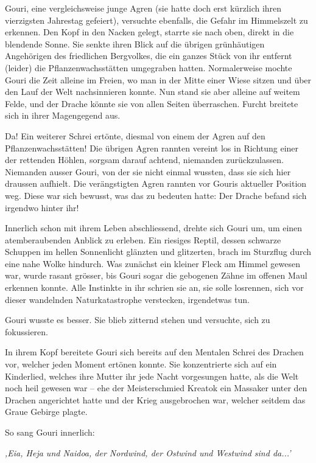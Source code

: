 Gouri, eine vergleichsweise junge Agren (sie hatte doch erst kürzlich ihren vierzigsten Jahrestag gefeiert), versuchte ebenfalls, die Gefahr im Himmelszelt zu erkennen. Den Kopf in den Nacken gelegt, starrte sie nach oben, direkt in die blendende Sonne. Sie senkte ihren Blick auf die übrigen grünhäutigen Angehörigen des friedlichen Bergvolkes, die ein ganzes Stück von ihr entfernt (leider) die Pflanzenwachsstätten umgegraben hatten. Normalerweise mochte Gouri die Zeit alleine im Freien, wo man in der Mitte einer Wiese sitzen und über den Lauf der Welt nachsinnieren konnte. Nun stand sie aber alleine auf weitem Felde, und der Drache könnte sie von allen Seiten überraschen. Furcht breitete sich in ihrer Magengegend aus.

Da! Ein weiterer Schrei ertönte, diesmal von einem der Agren auf den Pflanzenwachsstätten! Die übrigen Agren rannten vereint los in Richtung einer der rettenden Höhlen, sorgsam darauf achtend, niemanden zurückzulassen. Niemanden ausser Gouri, von der sie nicht einmal wussten, dass sie sich hier draussen aufhielt. Die verängstigten Agren rannten vor Gouris aktueller Position weg. Diese war sich bewusst, was das zu bedeuten hatte: Der Drache befand sich irgendwo hinter ihr!

Innerlich schon mit ihrem Leben abschliessend, drehte sich Gouri um, um einen atemberaubenden Anblick zu erleben. Ein riesiges Reptil, dessen schwarze Schuppen im hellen Sonnenlicht glänzten und glitzerten, brach im Sturzflug durch eine nahe Wolke hindurch. Was zunächst ein kleiner Fleck am Himmel gewesen war, wurde rasant grösser, bis Gouri sogar die gebogenen Zähne im offenen Maul erkennen konnte. Alle Instinkte in ihr schrien sie an, sie solle losrennen, sich vor dieser wandelnden Naturkatastrophe verstecken, irgendetwas tun.

Gouri wusste es besser. Sie blieb zitternd stehen und versuchte, sich zu fokussieren.

In ihrem Kopf bereitete Gouri sich bereits auf den Mentalen Schrei des Drachen vor, welcher jeden Moment ertönen konnte. Sie konzentrierte sich auf ein Kinderlied, welches ihre Mutter ihr jede Nacht vorgesungen hatte, als die Welt noch heil gewesen war – ehe der Meisterschmied Kreatok ein Massaker unter den Drachen angerichtet hatte und der Krieg ausgebrochen war, welcher seitdem das Graue Gebirge plagte.

So sang Gouri innerlich:

\textit{‚Eia, Heja und Naidoa, der Nordwind, der Ostwind und Westwind sind da...’}


